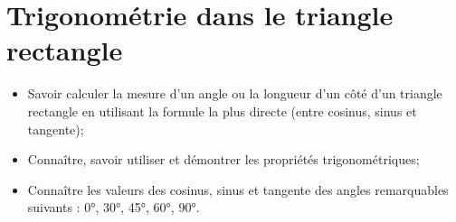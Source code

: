 \chapter{Trigonométrie dans le triangle rectangle}\label{ChTrigonometrie}

\begin{acquis}
\begin{itemize}
\item Savoir calculer la mesure d'un angle ou la longueur d'un côté d'un triangle rectangle en utilisant la formule la plus directe (entre cosinus, sinus et tangente);
\item Connaître, savoir utiliser et démontrer les propriétés trigonométriques;
\item  Connaître les valeurs des cosinus, sinus et tangente des angles remarquables suivants : 0°, 30°, 45°, 60°, 90°.
\end{itemize}
\end{acquis}

\exercicesbase
\begin{colonne*exercice}

\end{colonne*exercice}

\connaissances
%

\pagebreak



